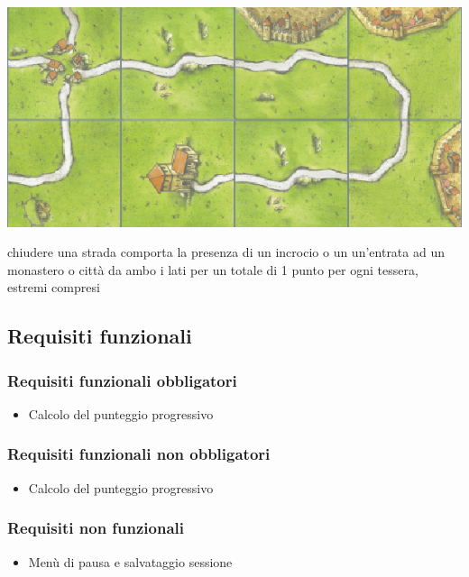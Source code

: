         {\includegraphics[scale=.42]{images/Strada.png}}

\vfill

chiudere una strada comporta la presenza di un incrocio o un un’entrata ad un monastero o città da ambo i lati per un totale di 1 punto per ogni tessera, estremi compresi

\subsection*{Requisiti funzionali}
\subsubsection*{Requisiti funzionali obbligatori}
\begin{itemize}
\item Calcolo del punteggio progressivo
\end{itemize}
\subsubsection*{Requisiti funzionali non obbligatori}
\begin{itemize}
\item Calcolo del punteggio progressivo
\end{itemize}

\subsubsection*{Requisiti non funzionali}
\begin{itemize}
\item Menù di pausa e salvataggio sessione
\end{itemize}

